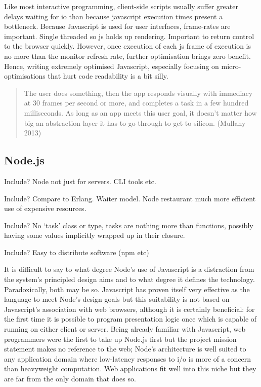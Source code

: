\documentclass[]{article}
\begin{document}
Like most interactive programming, client-side scripts usually suffer
greater delays waiting for io than because javascript execution times
present a bottleneck. Because Javascript is used for user interfaces,
frame-rates are important. Single threaded so js holds up rendering.
Important to return control to the browser quickly. However, once
execution of each js frame of execution is no more than the monitor
refresh rate, further optimisation brings zero benefit. Hence, writing
extremely optimised Javascript, especially focusing on
micro-optimisations that hurt code readability is a bit silly.

\begin{quote}
The user does something, then the app responds visually with immediacy
at 30 frames per second or more, and completes a task in a few hundred
milliseconds. As long as an app meets this user goal, it doesn't matter
how big an abstraction layer it has to go through to get to silicon.
(Mullany 2013)
\end{quote}

\subsection{Node.js}

Include? Node not just for servers. CLI tools etc.

Include? Compare to Erlang. Waiter model. Node restaurant much more
efficient use of expensive resources.

Include? No `task' class or type, tasks are nothing more than functions,
possibly having some values implicitly wrapped up in their closure.

Include? Easy to distribute software (npm etc)

It is difficult to say to what degree Node's use of Javascript is a
distraction from the system's principled design aims and to what degree
it defines the technology. Paradoxically, both may be so. Javascript has
proven itself very effective as the language to meet Node's design goals
but this suitability is not based on Javascript's association with web
browsers, although it is certainly beneficial: for the first time it is
possible to program presentation logic once which is capable of running
on either client or server. Being already familiar with Javascript, web
programmers were the first to take up Node.js first but the project
mission statement makes no reference to the web; Node's architecture is
well suited to any application domain where low-latency responses to i/o
is more of a concern than heavyweight computation. Web applications fit
well into this niche but they are far from the only domain that does so.
\end{document}
